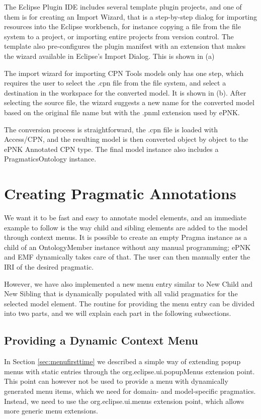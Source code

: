 The Eclipse Plugin IDE includes several template plugin projects, and one of
them is for creating an Import Wizard, that is a step-by-step dialog for
importing resources into the Eclipse workbench, for instance copying a file from
the file system to a project, or importing entire projects from version control.
The template also pre-configures the plugin manifest with an extension that
makes the wizard available in Eclipse's Import Dialog. This is shown in
 (a)

The import wizard for importing CPN Tools models only has one step, which
requires the user to select the .cpn file from the file system, and select a
destination in the workspace for the converted model. It is shown in
 (b). After selecting the source file, the wizard
suggests a new name for the converted model based on the original file name but
with the .pnml extension used by ePNK.


The conversion process is straightforward, the .cpn file is loaded with
Access/CPN, and the resulting model is then converted object by object to the
ePNK Annotated CPN type. The final model instance also includes a
PragmaticsOntology instance.

\section{Creating Pragmatic Annotations}
We want it to be fast and easy to annotate model elements, and an immediate
example to follow is the way child and sibling elements are added to the model
through context menus. It is possible to create an empty Pragma instance as a
child of an OntologyMember instance without any manual programming; ePNK and EMF
dynamically takes care of that. The user can then manually enter the IRI of the
desired pragmatic.

However, we have also implemented a new menu entry similar to New Child and New
Sibling that is dynamically populated with all valid pragmatics for the selected
model element. The routine for providing the menu entry can be divided into
two parts, and we will explain each part in the following subsections.

	\subsection{Providing a Dynamic Context Menu}
	In Section \ref{sec:menufirsttime} we described a simple way of extending popup
	menus with static entries through the org.eclipse.ui.popupMenus extension
	point. This point can however not be used to provide a menu with dynamically
	generated menu items, which we need for domain- and model-specific pragmatics.
	Instead, we need to use the org.eclipse.ui.menus extension point, which allows
	more generic menu extensions. 
	
